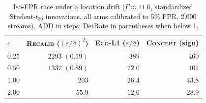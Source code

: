\begin{table}[h]
    \caption{Iso-FPR race under a location drift ($\Gamma \approx 11.6$, standardized Student-$t_{30}$ innovations, all arms calibrated to 5\% FPR, 2,000 streams). ADD in steps; DetRate in parentheses when below 1.}
    \label{tab:isofpr_race}
    \small
    \begin{tabular}{lrrr}
        \toprule
        $c$    & \textsc{Recalib} ($(\varepsilon/\hat\sigma)^2$) & \textsc{Eco-L1} ($\varepsilon/\hat\sigma$) & \textsc{Concept} (sign) \\
        \midrule
        $0.25$ & $2293$ \; $(0.19)$                              & $389$                                      & $460$                   \\
        $0.50$ & $1337$ \; $(0.89)$                              & $72.0$                                     & $101$                   \\
        $1.00$ & $203$                                           & $26.4$                                     & $43.8$                  \\
        $2.00$ & $55.9$                                          & $12.6$                                     & $28.9$                  \\
        \bottomrule
    \end{tabular}
\end{table}